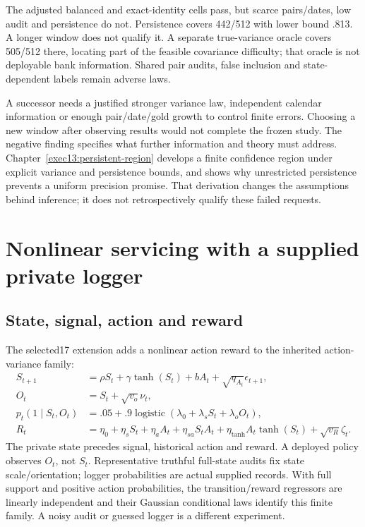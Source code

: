 The adjusted balanced and exact-identity cells pass, but scarce pairs/dates, low audit and persistence do not. Persistence covers 442/512 with lower bound .813. A longer window does not qualify it. A separate true-variance oracle covers 505/512 there, locating part of the feasible covariance difficulty; that oracle is not deployable bank information. Shared pair audits, false inclusion and state-dependent labels remain adverse laws.

A successor needs a justified stronger variance law, independent calendar information or enough pair/date/gold growth to control finite errors. Choosing a new window after observing results would not complete the frozen study. The negative finding specifies what further information and theory must address. Chapter~\ref{exec13:persistent-region} develops a finite confidence region under explicit variance and persistence bounds, and shows why unrestricted persistence prevents a uniform precision promise. That derivation changes the assumptions behind inference; it does not retrospectively qualify these failed requests.

\section{Nonlinear servicing with a supplied private logger}
\subsection{State, signal, action and reward}
The selected17 extension adds a nonlinear action reward to the inherited action-variance family:
\begin{align*}
 S_{t+1}&=\rho S_t+\gamma\tanh(S_t)+bA_t+\sqrt{q_{A_t}}\epsilon_{t+1},\\
 O_t&=S_t+\sqrt{v_o}\nu_t,\\
 p_t(1\mid S_t,O_t)&=.05+.9\operatorname{logistic}(\lambda_0+\lambda_sS_t+\lambda_oO_t),\\
 R_t&=\eta_0+\eta_sS_t+\eta_aA_t+\eta_{sa}S_tA_t+
 \eta_{\tanh}A_t\tanh(S_t)+\sqrt{v_R}\zeta_t.
\end{align*}
The private state precedes signal, historical action and reward. A deployed policy observes $O_t$, not $S_t$. Representative truthful full-state audits fix state scale/orientation; logger probabilities are actual supplied records. With full support and positive action probabilities, the transition/reward regressors are linearly independent and their Gaussian conditional laws identify this finite family. A noisy audit or guessed logger is a different experiment.

